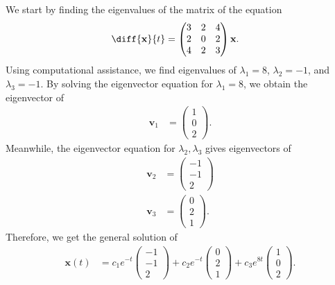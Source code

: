 \documentclass[10pt]{mypackage}
\begin{document}
\begin{solution}[8.2, Problem 24]
  We start by finding the eigenvalues of the matrix of the equation
  \begin{align*}
    \diff{\mathbf{x}}{t} &= \begin{pmatrix}3 & 2 & 4 \\ 2 & 0 & 2 \\ 4 & 2 & 3\end{pmatrix} \mathbf{x}.
  \end{align*}
  Using computational assistance, we find eigenvalues of $\lambda_1 = 8$, $\lambda_2 = -1$, and $\lambda_3 = -1$. By solving the eigenvector equation for $\lambda_1 = 8$, we obtain the eigenvector of
  \begin{align*}
    \mathbf{v}_1 &= \begin{pmatrix}1\\0\\2\end{pmatrix}.
  \end{align*}
  Meanwhile, the eigenvector equation for $\lambda_2,\lambda_3$ gives eigenvectors of
  \begin{align*}
    \mathbf{v}_2 &= \begin{pmatrix}-1\\-1\\2\end{pmatrix}\\
    \mathbf{v}_3 &= \begin{pmatrix}0\\2\\1\end{pmatrix}.
  \end{align*}
  Therefore, we get the general solution of
  \begin{align*}
    \mathbf{x}(t) &= c_1e^{-t} \begin{pmatrix}-1\\-1\\2\end{pmatrix} + c_2e^{-t} \begin{pmatrix}0\\2\\1\end{pmatrix} + c_3e^{8t} \begin{pmatrix}1\\0\\2\end{pmatrix}.
  \end{align*}
\end{solution}
\end{document}
